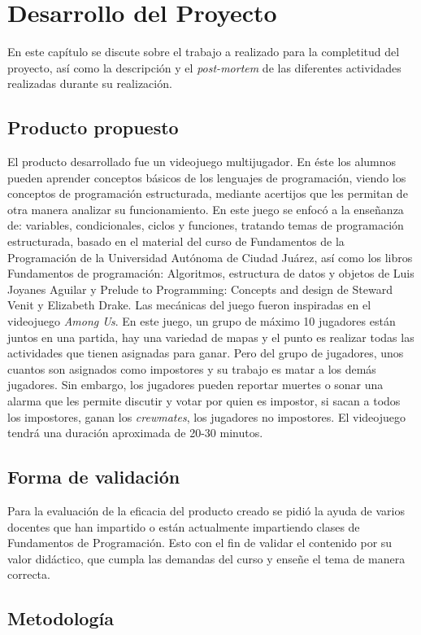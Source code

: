\chapter{Desarrollo del Proyecto}
En este capítulo se discute sobre el trabajo a realizado para la completitud del proyecto, así como la descripción y el \textit{post-mortem} de las diferentes actividades realizadas durante su realización.

\section{Producto propuesto}
El producto desarrollado fue un videojuego multijugador. En éste los alumnos pueden aprender conceptos básicos de los lenguajes de programación, viendo los conceptos de programación estructurada, mediante acertijos que les permitan de otra manera analizar su funcionamiento. En este juego se enfocó a la enseñanza de: variables, condicionales, ciclos y funciones, tratando temas de programación estructurada, basado en el material del curso de Fundamentos de la Programación de la Universidad Autónoma de Ciudad Juárez, así como los libros Fundamentos de programación: Algoritmos, estructura de datos y objetos de Luis Joyanes Aguilar y Prelude to Programming: Concepts and design de Steward Venit y Elizabeth Drake. 
Las mecánicas del juego fueron inspiradas en el videojuego \textit{Among Us}. En este juego, un grupo de máximo 10 jugadores están juntos en una partida, hay una variedad de mapas y el punto es realizar todas las actividades que tienen asignadas para ganar. Pero del grupo de jugadores, unos cuantos son asignados como impostores y su trabajo es matar a los demás jugadores. Sin embargo, los jugadores pueden reportar muertes o sonar una alarma que les permite discutir y votar por quien es impostor, si sacan a todos los impostores, ganan los \textit{crewmates}, los jugadores no impostores.
El videojuego tendrá una duración aproximada de 20-30 minutos.

\section{Forma de validación}
Para la evaluación de la eficacia del producto creado se pidió la ayuda de varios docentes que han impartido o están actualmente impartiendo clases de Fundamentos de Programación. Esto con el fin de validar el contenido por su valor didáctico, que cumpla las demandas del curso y enseñe el tema de manera correcta.

\section{Metodología}

